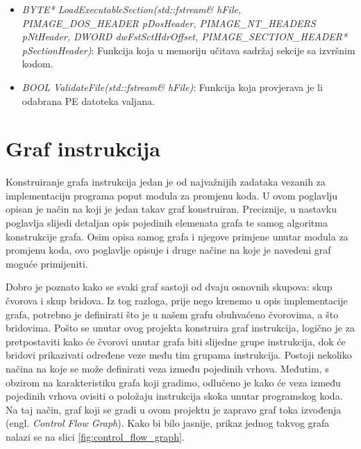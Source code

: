 \documentclass[times, utf8, diplomski, numeric]{fer}
\begin{document}
\begin{itemize}
\item {\footnotesize \emph{BYTE*
LoadExecutableSection(std::fstream\& hFile, PIMAGE\_DOS\_HEADER
pDosHeader, PIMAGE\_NT\_HEADERS pNtHeader, DWORD
dwFstSctHdrOffset, PIMAGE\_SECTION\_HEADER* pSectionHeader)}}:
Funkcija koja u memoriju učitava sadržaj sekcije sa izvršnim
kodom.

\item {\footnotesize \emph{BOOL ValidateFile(std::fstream\&
hFile)}}: Funkcija koja provjerava je li odabrana PE datoteka
valjana.

\end{itemize}

\section{Graf instrukcija}
\label{sct:instructionGraph}

Konstruiranje grafa instrukcija jedan je od najvažnijih zadataka vezanih za
implementaciju programa poput modula za promjenu koda. U ovom poglavlju opisan
je način na koji je jedan takav graf konstruiran. Preciznije, u nastavku
poglavlja slijedi detaljan opis pojedinih elemenata grafa te samog algoritma
konstrukcije grafa. Osim opisa samog grafa i njegove primjene unutar modula za
promjenu koda, ovo poglavlje opisuje i druge načine na koje je navedeni graf		%
moguće primijeniti. 									%

Dobro je poznato kako se svaki graf sastoji od dvaju osnovnih skupova: skup
čvorova i skup bridova. Iz tog razloga, prije nego krenemo u opis
implementacije grafa, potrebno je definirati što je u našem grafu obuhvaćeno
čvorovima, a što bridovima. Pošto se unutar ovog projekta konstruira graf
instrukcija, logično je za pretpostaviti kako će čvorovi unutar grafa biti
slijedne grupe instrukcija, dok će bridovi prikazivati određene veze među tim
grupama instrukcija. Postoji nekoliko načina na koje se može definirati veza
između pojedinih vrhova. Međutim, s obzirom na karakteristiku grafa koji
gradimo, odlučeno je kako će veza između pojedinih vrhova ovisiti o položaju
instrukcija skoka unutar programskog koda. Na taj način, graf koji se gradi u
ovom projektu je zapravo graf toka izvođenja (engl. \emph{Control Flow Graph}).
Kako bi bilo jasnije, prikaz jednog takvog grafa nalazi se na slici 
\ref{fig:control_flow_graph}.
\end{document}
